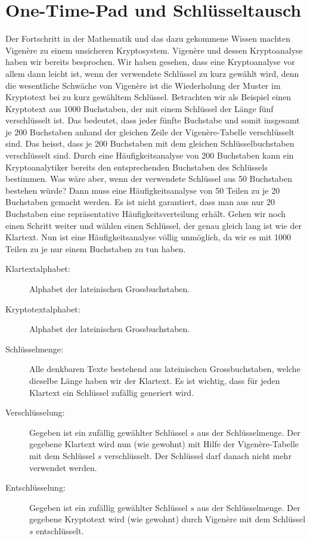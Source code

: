 \chapter{One-Time-Pad und Schlüsseltausch}\label{ch:02}
Der Fortschritt in der Mathematik und das dazu gekommene Wissen machten Vigenère zu einem unsicheren Kryptosystem.
Vigenère und dessen Kryptoanalyse haben wir bereits besprochen. Wir haben gesehen, dass eine Kryptoanalyse vor allem dann leicht ist,
wenn der verwendete Schlüssel zu kurz gewählt wird, denn die wesentliche Schwäche
von Vigenère ist die Wiederholung der Muster im Kryptotext bei zu kurz gewähltem
Schlüssel. Betrachten wir als Beispiel einen Kryptotext aus 1000 Buchstaben, der mit einem Schlüssel der Länge fünf verschlüsselt ist. Das bedeutet, dass jeder fünfte Buchstabe und somit insgesamt je 200 Buchstaben anhand der gleichen Zeile der Vigenère-Tabelle
verschlüsselt sind. Das heisst, dass je 200 Buchstaben mit dem gleichen Schlüsselbuchstaben verschlüsselt sind. Durch eine Häufigkeitsanalyse von 200 Buchstaben kann ein
Kryptoanalytiker bereits den entsprechenden Buchstaben des Schlüssels bestimmen.
Was wäre aber, wenn der verwendete Schlüssel aus 50 Buchstaben bestehen würde?
Dann muss eine Häufigkeitsanalyse von 50 Teilen zu je 20 Buchstaben gemacht werden.
Es ist nicht garantiert, dass man aus nur 20 Buchstaben eine repräsentative Häufigkeitsverteilung erhält. Gehen wir noch einen Schritt weiter und wählen einen Schlüssel, der
genau gleich lang ist wie der Klartext. Nun ist eine Häufigkeitsanalyse völlig unmöglich,
da wir es mit 1000 Teilen zu je nur einem Buchstaben zu tun haben.

\begin{myprocedure}\label{myprocedure:onetime}
	\leavevmode
	\begin{description}
		\item[Klartextalphabet:] Alphabet der lateinischen Grossbuchstaben.
		\item[Kryptotextalphabet:] Alphabet der lateinischen Grossbuchstaben.
		\item[Schlüsselmenge:] Alle denkbaren Texte bestehend aus lateinischen Grossbuchstaben, welche dieselbe Länge haben wir der Klartext. Es ist wichtig, dass für jeden Klartext ein Schlüssel zufällig generiert wird.
		\item[Verschlüsselung:] Gegeben ist ein zufällig gewählter Schlüssel $s$ aus der Schlüsselmenge. Der gegebene Klartext wird nun (wie gewohnt) mit Hilfe der Vigenère-Tabelle mit dem Schlüssel $s$ verschlüsselt. Der Schlüssel darf danach nicht mehr verwendet werden.
		\item[Entschlüsselung:] Gegeben ist ein zufällig gewählter Schlüssel $s$ aus der Schlüsselmenge. Der gegebene Kryptotext wird (wie gewohnt) durch Vigenère mit dem Schlüssel $s$ entschlüsselt.
	\end{description}
\end{myprocedure}

